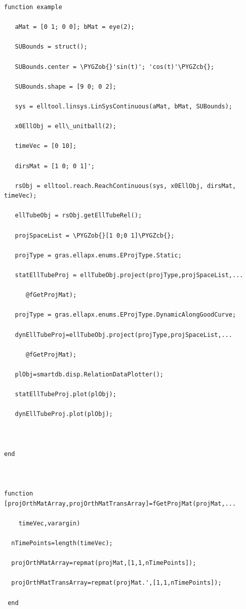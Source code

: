\documentclass[letterpaper,10pt,english]{sphinxmanual}
\def\PYGZob{\char`\{}
\def\PYGZcb{\char`\}}
\begin{document}
\begin{Verbatim}[commandchars=\\\{\}]
function example

   aMat = [0 1; 0 0]; bMat = eye(2);  

   SUBounds = struct();

   SUBounds.center = \PYGZob{}'sin(t)'; 'cos(t)'\PYGZcb{};  

   SUBounds.shape = [9 0; 0 2]; 

   sys = elltool.linsys.LinSysContinuous(aMat, bMat, SUBounds);

   x0EllObj = ell\_unitball(2);

   timeVec = [0 10]; 

   dirsMat = [1 0; 0 1]';  

   rsObj = elltool.reach.ReachContinuous(sys, x0EllObj, dirsMat, timeVec);

   ellTubeObj = rsObj.getEllTubeRel();

   projSpaceList = \PYGZob{}[1 0;0 1]\PYGZcb{};

   projType = gras.ellapx.enums.EProjType.Static;

   statEllTubeProj = ellTubeObj.project(projType,projSpaceList,...

      @fGetProjMat);

   projType = gras.ellapx.enums.EProjType.DynamicAlongGoodCurve;

   dynEllTubeProj=ellTubeObj.project(projType,projSpaceList,...

      @fGetProjMat);

   plObj=smartdb.disp.RelationDataPlotter();

   statEllTubeProj.plot(plObj);

   dynEllTubeProj.plot(plObj);



end



function [projOrthMatArray,projOrthMatTransArray]=fGetProjMat(projMat,...

    timeVec,varargin)

  nTimePoints=length(timeVec);

  projOrthMatArray=repmat(projMat,[1,1,nTimePoints]);

  projOrthMatTransArray=repmat(projMat.',[1,1,nTimePoints]);

 end
\end{Verbatim}
\end{document}
